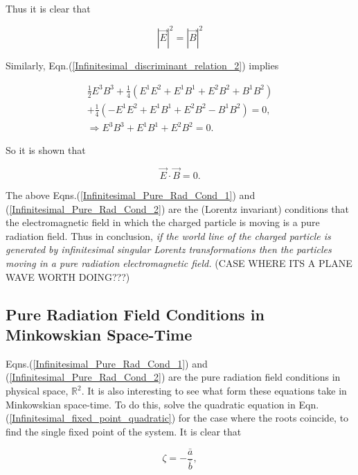 \noindent Thus it is clear that

\begin{equation}\label{Infinitesimal_Pure_Rad_Cond_1}
{|\vec{E}|}^2 = {|\vec{B}|}^2
\end{equation}

\noindent Similarly, Eqn.(\ref{Infinitesimal_discriminant_relation_2}) implies

\begin{eqnarray*}
\frac{1}{2} E^3 B^3 + \frac{1}{4} (E^1E^2 + E^1B^1 + E^2B^2 + B^1B^2) \\
 +  \frac{1}{4} (-E^1E^2 + E^1B^1 + E^2B^2 - B^1B^2) = 0, \\
\Rightarrow E^3B^3 + E^1B^1 + E^2B^2 = 0.
\end{eqnarray*}

\noindent So it is shown that

\begin{equation}\label{Infinitesimal_Pure_Rad_Cond_2}
\vec{E} \cdot \vec{B} = 0.
\end{equation}

\noindent The above Eqns.(\ref{Infinitesimal_Pure_Rad_Cond_1}) and (\ref{Infinitesimal_Pure_Rad_Cond_2}) are the (Lorentz invariant) conditions that the electromagnetic field in which the charged particle is moving is a pure radiation field. Thus in conclusion, \textit{if the world line of the charged particle is generated by infinitesimal singular Lorentz transformations then the particles moving in a pure radiation electromagnetic field.} (CASE WHERE ITS A PLANE WAVE WORTH DOING???)

\subsection{Pure Radiation Field Conditions in Minkowskian Space-Time}

Eqns.(\ref{Infinitesimal_Pure_Rad_Cond_1}) and (\ref{Infinitesimal_Pure_Rad_Cond_2}) are the pure radiation field conditions in physical space, ${\mathbb{R}}^2$. It is also interesting to see what form these equations take in Minkowskian space-time. To do this, solve the quadratic equation in Eqn.(\ref{Infinitesimal_fixed_point_quadratic}) for the case where the roots coincide, to find the single fixed point of the system. It is clear that 

\begin{equation}\label{Infinitesimal_Zeta_Fixed_Point}
\zeta = - \frac{\bar{a}}{\bar{b}},
\end{equation}

